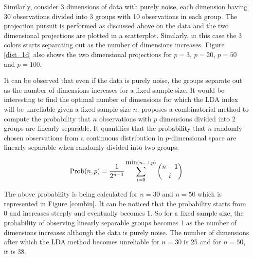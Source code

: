 \documentclass[12]{article}
\begin{document}
Similarly, consider 3 dimensions of data with purely noise, each dimension having 30 observations divided into 3 groups with 10 observations in each group. The projection pursuit is performed as discussed above on the data and the two dimensional projections are plotted in a scatterplot. Similarly, in this case the 3 colors starts separating out as the number of dimensions increases.  Figure \ref{dist_1d} also shows the two dimensional projections for $p=3$, $p=20$, $p=50$ and $p=100$.

It can be observed that even if the data is purely noise, the groups separate out as the number of dimensions increases for a fixed sample size. It would be interesting to find the optimal number of dimensions for which the LDA index will be unreliable given a fixed sample size $n$. \cite{ripley:1996} proposes a combinatorial method to compute the probability that $n$ observations with $p$ dimensions divided into 2 groups are linearly separable. It quantifies that the probability that $n$ randomly chosen observations from a continuous distribution in $p$-dimensional space are linearly separable when randomly divided into two groups:

$$\hbox{Prob}(n, p) = \frac{1}{2^{n - 1}} \sum_{i = 0}^{\hbox{min}(n - 1, p)}{n - 1\choose i}$$

The above probability is being calculated for $n = 30$ and $n = 50$ which is represented in Figure \ref{combin}.  It can be noticed that the probability starts from 0 and increases steeply and eventually becomes 1. So for a fixed sample size, the probability of observing linearly separable groups becomes 1 as the number of dimensions increases although the data is purely noise. The number of dimensions after which the LDA method becomes unreliable for $n = 30$ is 25 and for $n = 50$, it is 38.  
\end{document}
